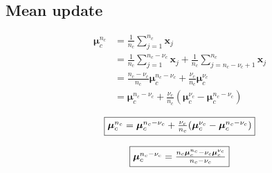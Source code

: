 \documentclass[a4paper,11pt,DIV=16]{scrartcl}
\begin{document}
    \subsection{Mean update}
        \begin{align*}
            \boldsymbol{\mu}_c^{n_c} &= \frac{1}{n_c} \sum_{j = 1}^{n_c} \mathbf{x}_j \\
                        &= \frac{1}{n_c} \sum_{j = 1}^{n_c-\nu_c} \mathbf{x}_j + \frac{1}{n_c} \sum_{j = n_c-\nu_c +1}^{n_c} \mathbf{x}_j \\
                        &= \frac{n_c-\nu_c}{n_c} \boldsymbol{\mu}_c^{n_c-\nu_c} + \frac{\nu_c}{n_c} \boldsymbol{\mu}_c^{\nu_c} \\
                        &= \boldsymbol{\mu}_c^{n_c-\nu_c} + \frac{\nu_c}{n_c} (\boldsymbol{\mu}_c^{\nu_c} - \boldsymbol{\mu}_c^{n_c-\nu_c})
        \end{align*}

        \begin{equation}
             \fbox{$\boldsymbol{\mu}_c^{n_c} = \boldsymbol{\mu}_c^{n_c-\nu_c} + \frac{\nu_c}{n_c} (\boldsymbol{\mu}_c^{\nu_c} - \boldsymbol{\mu}_c^{n_c-\nu_c})$}
        \end{equation}

        \begin{equation}
            \fbox{$\boldsymbol{\mu}_c^{n_c-\nu_c} = \frac{n_c \boldsymbol{\mu}_c^{n_c} - \nu_c \boldsymbol{\mu}_c^{\nu_c}}{n_c - \nu_c}$}
        \end{equation}
\end{document}
